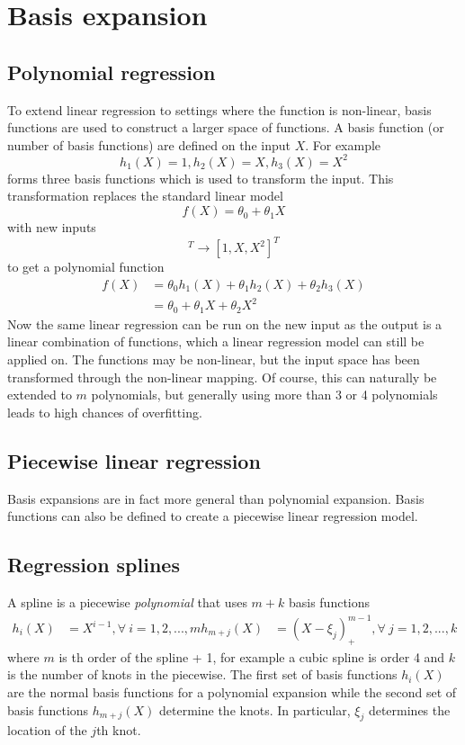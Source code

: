 \documentclass[CS5104-Notes.tex]{subfiles}
\begin{document}
\section{Basis expansion}

\subsection{Polynomial regression}
To extend linear regression to settings where the function is non-linear, basis functions are used to construct a larger space of functions. A basis function (or number of basis functions) are defined on the input $X$. For example
\begin{equation}
h_{1}(X) = 1, h_{2}(X) = X, h_{3}(X) = X^{2}
\end{equation}
forms three basis functions which is used to transform the input. This transformation replaces the standard linear model
\begin{equation}
f(X) = \theta_{0} + \theta_{1}X
\end{equation}
with new inputs
\begin{equation}
[h_{1}(X), h_{2}(X), h_{3}(X)]^{T} \rightarrow [1,X,X^{2}]^{T}
\end{equation}
to get a polynomial function
\begin{align}
f(X) &= \theta_{0}h_{1}(X) + \theta_{1}h_{2}(X) + \theta_{2}h_{3}(X) \\
 &= \theta_{0} + \theta_{1}X + \theta_{2}X^{2}
\end{align}
Now the same linear regression can be run on the new input as the output is a linear combination of functions, which a linear regression model can still be applied on. The functions may be non-linear, but the input space has been transformed through the non-linear mapping. Of course, this can naturally be extended to $m$ polynomials, but generally using more than 3 or 4 polynomials leads to high chances of overfitting.

\subsection{Piecewise linear regression} Basis expansions are in fact more general than polynomial expansion. Basis functions can also be defined to create a piecewise linear regression model. 

\subsection{Regression splines}
A spline is a piecewise \textit{polynomial} that uses $m + k$ basis functions
\begin{align}
  h_{i}(X) &= X^{i-1}, \forall\ i = 1, 2, ..., m
  h_{m+j}(X) &= (X - \xi_{j})_{+}^{m-1}, \forall\ j = 1, 2, ..., k
\end{align}
where $m$ is th order of the spline + 1, for example a cubic spline is order 4 and $k$ is the number of knots in the piecewise.
\n
The first set of basis functions $h_{i}(X)$ are the normal basis functions for a polynomial expansion while the second set of basis functions $h_{m+j}(X)$ determine the knots. In particular, $\xi_{j}$ determines the location of the $j$th knot. 
\end{document}
